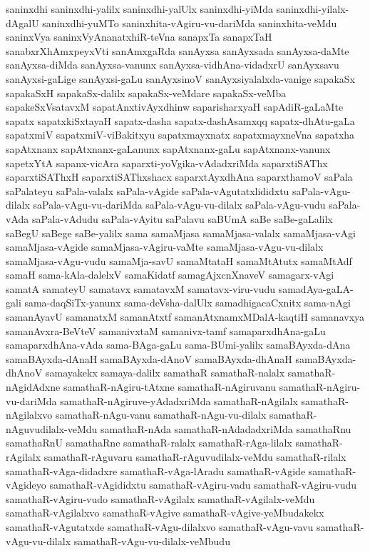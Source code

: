 {saninxdhi
saninxdhi-yalilx
saninxdhi-yalUlx
saninxdhi-yiMda
saninxdhi-yilalx-dAgalU
saninxdhi-yuMTo
saninxhita-vAgiru-vu-dariMda
saninxhita-veMdu
saninxVya
saninxVyAnanatxhiR-teVna
sanapxTa
sanapxTaH
sanabxrXhAmxpeyxVti
sanAmxgaRda
sanAyxsa
sanAyxsada
sanAyxsa-daMte
sanAyxsa-diMda
sanAyxsa-vanunx
sanAyxsa-vidhAna-vidadxrU
sanAyxsavu
sanAyxsi-gaLige
sanAyxsi-gaLu
sanAyxsinoV
sanAyxsiyalalxda-vanige
sapakaSx
sapakaSxH
sapakaSx-dalilx
sapakaSx-veMdare
sapakaSx-veMba
sapakeSxVsatavxM
sapatAnxtivAyxdhinw
saparisharxyaH
sapAdiR-gaLaMte
sapatx
sapatxkiSxtayaH
sapatx-dasha
sapatx-dashAsamxqq
sapatx-dhAtu-gaLa
sapatxmiV
sapatxmiV-viBakitxyu
sapatxmayxnatx
sapatxmayxneVna
sapatxha
sapAtxnanx
sapAtxnanx-gaLanunx
sapAtxnanx-gaLu
sapAtxnanx-vanunx
sapetxYtA
sapanx-vicAra
saparxti-yoVgika-vAdadxriMda
saparxtiSAThx
saparxtiSAThxH
saparxtiSAThxshacx
saparxtAyxdhAna
saparxthamoV
saPala
saPalateyu
saPala-valalx
saPala-vAgide
saPala-vAgutatxlididxtu
saPala-vAgu-dilalx
saPala-vAgu-vu-dariMda
saPala-vAgu-vu-dilalx
saPala-vAgu-vudu
saPala-vAda
saPala-vAdudu
saPala-vAyitu
saPalavu
saBUmA
saBe
saBe-gaLalilx
saBegU
saBege
saBe-yalilx
sama
samaMjasa
samaMjasa-valalx
samaMjasa-vAgi
samaMjasa-vAgide
samaMjasa-vAgiru-vaMte
samaMjasa-vAgu-vu-dilalx
samaMjasa-vAgu-vudu
samaMja-savU
samaMtataH
samaMtAtutx
samaMtAdf
samaH
sama-kAla-dalelxV
samaKidatf
samagAjxcnXnaveV
samagarx-vAgi
samatA
samateyU
samatavx
samatavxM
samatavx-viru-vudu
samadAya-gaLA-gali
sama-daqSiTx-yanunx
sama-deVsha-dalUlx
samadhigacaCxnitx
sama-nAgi
samanAyavU
samanatxM
samanAtxtf
samanAtxnamxMDalA-kaqtiH
samanavxya
samanAvxra-BeVteV
samanivxtaM
samanivx-tamf
samaparxdhAna-gaLu
samaparxdhAna-vAda
sama-BAga-gaLu
sama-BUmi-yalilx
samaBAyxda-dAna
samaBAyxda-dAnaH
samaBAyxda-dAnoV
samaBAyxda-dhAnaH
samaBAyxda-dhAnoV
samayakekx
samaya-dalilx
samathaR
samathaR-nalalx
samathaR-nAgidAdxne
samathaR-nAgiru-tAtxne
samathaR-nAgiruvanu
samathaR-nAgiru-vu-dariMda
samathaR-nAgiruve-yAdadxriMda
samathaR-nAgilalx
samathaR-nAgilalxvo
samathaR-nAgu-vanu
samathaR-nAgu-vu-dilalx
samathaR-nAguvudilalx-veMdu
samathaR-nAda
samathaR-nAdadadxriMda
samathaRnu
samathaRnU
samathaRne
samathaR-ralalx
samathaR-rAga-lilalx
samathaR-rAgilalx
samathaR-rAguvaru
samathaR-rAguvudilalx-veMdu
samathaR-rilalx
samathaR-vAga-didadxre
samathaR-vAga-lAradu
samathaR-vAgide
samathaR-vAgideyo
samathaR-vAgididxtu
samathaR-vAgiru-vadu
samathaR-vAgiru-vudu
samathaR-vAgiru-vudo
samathaR-vAgilalx
samathaR-vAgilalx-veMdu
samathaR-vAgilalxvo
samathaR-vAgive
samathaR-vAgive-yeMbudakekx
samathaR-vAgutatxde
samathaR-vAgu-dilalxvo
samathaR-vAgu-vavu
samathaR-vAgu-vu-dilalx
samathaR-vAgu-vu-dilalx-veMbudu
}
